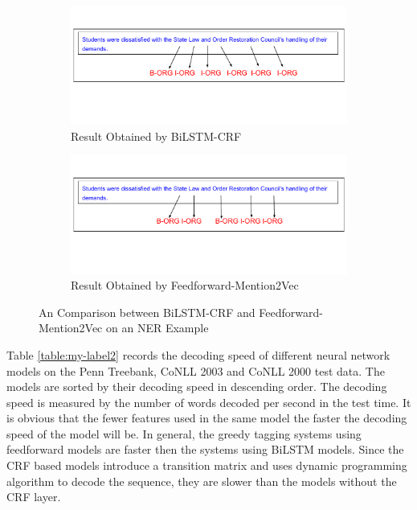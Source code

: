 \begin{figure}
\hspace{-1cm}
\begin{subfigure}{\linewidth}
\includegraphics[width=1.1\linewidth]{NERbilstm2.pdf}
\vspace{-3cm}
\caption{Result Obtained by BiLSTM-CRF}
\end{subfigure}\par\medskip
\hspace{-1cm}
\begin{subfigure}{\linewidth}
\vspace{-1cm}
\includegraphics[width=1.1\linewidth]{NERmen.pdf}
\vspace{-3cm}
\caption{Result Obtained by Feedforward-Mention2Vec}
\end{subfigure}
\caption{An Comparison between BiLSTM-CRF and Feedforward-Mention2Vec on an NER Example}
\label{fig:comp2}
\end{figure}

Table \ref{table:my-label2} records the decoding speed of different neural network models on the Penn Treebank, CoNLL 2003 and CoNLL 2000 test data. The models are sorted by their decoding speed in descending order. The decoding speed is measured by the number of words decoded per second in the test time. It is obvious that the fewer features used in the same model the faster the decoding speed of the model will be. In general, the greedy tagging systems using feedforward models are faster then the systems using BiLSTM models. Since the CRF based models introduce a transition matrix and uses dynamic programming algorithm to decode the sequence, they are slower than the models without the CRF layer.


